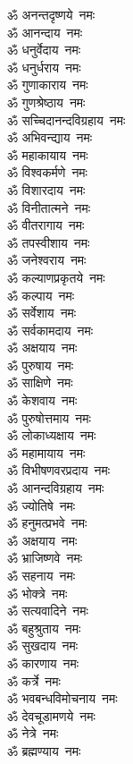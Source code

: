\begin{multicols}{2}
\begin{flushleft}
ॐ अनन्तदृष्णये~नमः\\
ॐ आनन्दाय~नमः\hfill{}\\
ॐ धनुर्वेदाय~नमः\\
ॐ धनुर्धराय~नमः\\
ॐ गुणाकाराय~नमः\\
ॐ गुणश्रेष्ठाय~नमः\\
ॐ सच्चिदानन्दविग्रहाय~नमः\\
ॐ अभिवन्द्याय~नमः\\
ॐ महाकायाय~नमः\\
ॐ विश्वकर्मणे~नमः\\
ॐ विशारदाय~नमः\\
ॐ विनीतात्मने~नमः\hfill{}\\
ॐ वीतरागाय~नमः\\
ॐ तपस्वीशाय~नमः\\
ॐ जनेश्वराय~नमः\\
ॐ कल्याणप्रकृतये~नमः\\
ॐ कल्पाय~नमः\\
ॐ सर्वेशाय~नमः\\
ॐ सर्वकामदाय~नमः\\
ॐ अक्षयाय~नमः\\
ॐ पुरुषाय~नमः\\
ॐ साक्षिणे~नमः\hfill{}\\
ॐ केशवाय~नमः\\
ॐ पुरुषोत्तमाय~नमः\\
ॐ लोकाध्यक्षाय~नमः\\
ॐ महामायाय~नमः\\
ॐ विभीषणवरप्रदाय~नमः\\
ॐ आनन्दविग्रहाय~नमः\\
ॐ ज्योतिषे~नमः\\
ॐ हनुमत्प्रभवे~नमः\\
ॐ अक्षयाय~नमः\\
ॐ भ्राजिष्णवे~नमः\hfill{}\\
ॐ सहनाय~नमः\\
ॐ भोक्त्रे~नमः\\
ॐ सत्यवादिने~नमः\\
ॐ बहुश्रुताय~नमः\\
ॐ सुखदाय~नमः\\
ॐ कारणाय~नमः\\
ॐ कर्त्रे~नमः\\
ॐ भवबन्धविमोचनाय~नमः\\
ॐ देवचूडामणये~नमः\\
ॐ नेत्रे~नमः\hfill{}\\
ॐ ब्रह्मण्याय~नमः\\

\end{flushleft}
\end{multicols}

